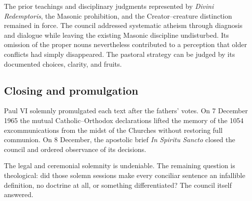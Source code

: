 The prior teachings and disciplinary judgments represented by \emph{Divini Redemptoris}, the Masonic prohibition, and the Creator--creature distinction remained in force. The council addressed systematic atheism through diagnosis and dialogue while leaving the existing Masonic discipline undisturbed. Its omission of the proper nouns nevertheless contributed to a perception that older conflicts had simply disappeared. The pastoral strategy can be judged by its documented choices, clarity, and fruits.

\subsection{Closing and promulgation}

Paul VI solemnly promulgated each text after the fathers' votes. On 7 December 1965 the mutual Catholic--Orthodox declarations lifted the memory of the 1054 excommunications from the midst of the Churches without restoring full communion. On 8 December, the apostolic brief \emph{In Spiritu Sancto} closed the council and ordered observance of its decisions.

The legal and ceremonial solemnity is undeniable. The remaining question is theological: did those solemn sessions make every conciliar sentence an infallible definition, no doctrine at all, or something differentiated? The council itself answered.


